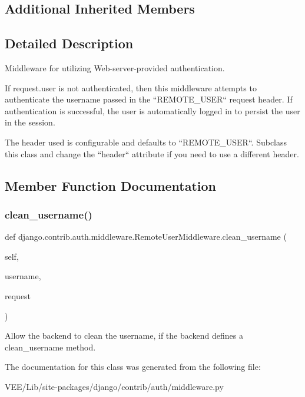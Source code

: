 \subsection*{Additional Inherited Members}


\subsection{Detailed Description}
\begin{DoxyVerb}Middleware for utilizing Web-server-provided authentication.

If request.user is not authenticated, then this middleware attempts to
authenticate the username passed in the ``REMOTE_USER`` request header.
If authentication is successful, the user is automatically logged in to
persist the user in the session.

The header used is configurable and defaults to ``REMOTE_USER``.  Subclass
this class and change the ``header`` attribute if you need to use a
different header.
\end{DoxyVerb}
 

\subsection{Member Function Documentation}
\mbox{\label{classdjango_1_1contrib_1_1auth_1_1middleware_1_1_remote_user_middleware_adf328662e2d470e0cde2d82721308296}} 
\subsubsection{\texorpdfstring{clean\+\_\+username()}{clean\_username()}}
{\footnotesize\ttfamily def django.\+contrib.\+auth.\+middleware.\+Remote\+User\+Middleware.\+clean\+\_\+username (\begin{DoxyParamCaption}\item[{}]{self,  }\item[{}]{username,  }\item[{}]{request }\end{DoxyParamCaption})}

\begin{DoxyVerb}Allow the backend to clean the username, if the backend defines a
clean_username method.
\end{DoxyVerb}
 

The documentation for this class was generated from the following file\+:\begin{DoxyCompactItemize}
\item 
V\+E\+E/\+Lib/site-\/packages/django/contrib/auth/middleware.\+py\end{DoxyCompactItemize}
